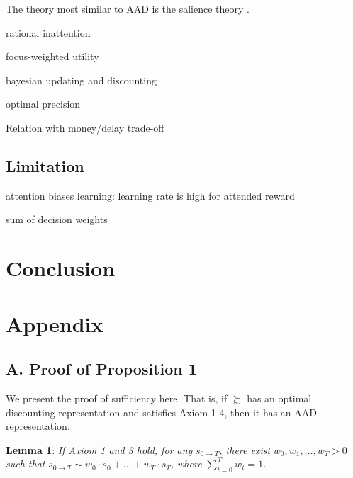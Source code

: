 \documentclass[
  12pt,
]{article}
\begin{document}
The theory most similar to AAD is the salience theory
\citep{bordalo2012salience, bordalo2013salience, bordalo2020memory}.

rational inattention

focus-weighted utility

bayesian updating and discounting

optimal precision

Relation with money/delay trade-off

\hypertarget{limitation}{%
\subsection{Limitation}\label{limitation}}

attention biases learning: learning rate is high for attended reward

sum of decision weights

\hypertarget{conclusion}{%
\section{Conclusion}\label{conclusion}}

\renewcommand\refname{Reference}
  

\newpage

\hypertarget{appendix}{%
\section*{Appendix}\label{appendix}}

\hypertarget{a.-proof-of-proposition-1}{%
\subsection*{A. Proof of Proposition
1}\label{a.-proof-of-proposition-1}}

We present the proof of sufficiency here. That is, if \(\succsim\) has
an optimal discounting representation and satisfies Axiom 1-4, then it
has an AAD representation.

\noindent \textbf{Lemma 1}: \emph{If Axiom 1 and 3 hold, for any}
\(s_{0\rightarrow T}\)\emph{, there exist} \(w_0, w_1, …, w_T > 0\)
\emph{such that}
\(s_{0\rightarrow T} \sim w_0 \cdot s_0 + ...+w_T\cdot s_T\)\emph{,
where} \(\sum_{t=0}^T w_t=1\)\emph{.}
\end{document}
